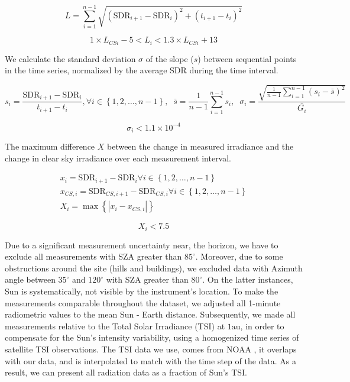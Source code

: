\documentclass[preprint, 3p,
authoryear]{elsarticle} %
\begin{document}
\begin{equation}
L = \sum_{i=1}^{n-1}\sqrt{\left ( \text{SDR}_{i+1} - \text{SDR}_{i}\right )^2 + \left ( t_{i+1} - t_i \right )^2}
\label{eq:VILeq}
\end{equation}

\begin{equation}
1 \times L_{CSi} - 5 < L_i < 1.3 \times L_{CSi} + 13
\label{eq:VILcr}
\end{equation}

We calculate the standard deviation \(\sigma\) of the slope (\(s\))
between sequential points in the time series, normalized by the average
SDR during the time interval.

\begin{equation}
s_i = \frac{\text{SDR}_{i+1} - \text{SDR}_{i}}{t_{i+1} - t_i}, \forall i \in \left \{ 1, 2, \ldots, n-1 \right \},\;\;
\bar{s} = \frac{1}{n-1} \sum_{i=1}^{n-1} s_i,\;\;
\sigma_i = \frac {\sqrt{\frac{1}{n-1} \sum_{i=1}^{n-1} \left( s_i - \bar{s} \right)^2} } {\bar{G_i}} \label{eq:VCT3b}
\end{equation}

\begin{equation}
\sigma_i < \ensuremath{1.1\times 10^{-4}}
\label{eq:VCTcr}
\end{equation}

The maximum difference \(X\) between the change in measured irradiance
and the change in clear sky irradiance over each measurement interval.

\begin{gather}
x_i = \text{SDR}_{i+1} - \text{SDR}_{i} \forall i \in \left \{ 1, 2, \ldots, n-1 \right \} \label{eq:VSM1} \\
x_{CS,i} = \text{SDR}_{CS,i+1} - \text{SDR}_{CS,i} \forall i \in \left \{ 1, 2, \ldots, n-1 \right \} \label{eq:VSM2} \\
X_i = \max{\left \{ \left | x_i - x_{CS,i} \right | \right \}} \label{eq:VSM3}
\end{gather}

\begin{equation}
X_i < 7.5
\label{eq:VSMcr}
\end{equation}

Due to a significant measurement uncertainty near, the horizon, we have
to exclude all measurements with SZA greater than \(85^\circ\).
Moreover, due to some obstructions around the site (hills and
buildings), we excluded data with Azimuth angle between \(35^\circ\) and
\(120^\circ\) with SZA greater than \(80^\circ\). On the latter
instances, Sun is systematically, not visible by the instrument's
location. To make the measurements comparable throughout the dataset, we
adjusted all 1-minute radiometric values to the mean Sun - Earth
distance. Subsequently, we made all measurements relative to the Total
Solar Irradiance (TSI) at \(1 \text{au}\), in order to compensate for
the Sun's intensity variability, using a homogenized time series of
satellite TSI observations. The TSI data we use, comes from NOAA
\citep{Coddington2005}, it overlaps with our data, and is interpolated
to match with the time step of the data. As a result, we can present all
radiation data as a fraction of Sun's TSI.
\end{document}
